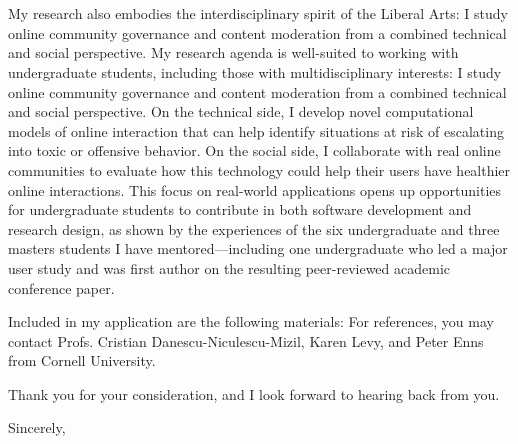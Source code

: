\documentclass[12pt]{letter}
\begin{document}
\begin{letter}{
\department \\
\schoolnamelong \\
\schooladdress
}
\ifliberalarts
My research also embodies the interdisciplinary spirit of the Liberal Arts: I study online community governance and content moderation from a combined technical and social perspective.
\else
My research agenda is well-suited to working with undergraduate students, including those with multidisciplinary interests: I study online community governance and content moderation from a combined technical and social perspective.
\fi
On the technical side, I develop novel computational models of online interaction that can help identify situations at risk of escalating into toxic or offensive behavior.
On the social side, I collaborate with real online communities to evaluate how this technology could help their users have healthier online interactions.
This focus on real-world applications opens up opportunities for undergraduate students to contribute in both software development and research design, as shown by the experiences of the six undergraduate and three masters students I have mentored---including one undergraduate who led a major user study and was first author on the resulting peer-reviewed academic conference paper.
\coverresearchpara

Included in my application are the following materials: \materials
For references, you may contact Profs. Cristian Danescu-Niculescu-Mizil, Karen Levy, and Peter Enns from Cornell University.

Thank you for your consideration, and I look forward to hearing back from you.

\closing{Sincerely,}

\end{letter}
\end{document}
